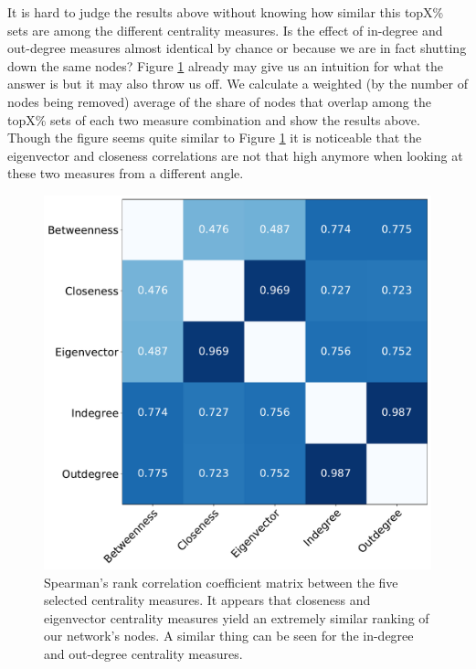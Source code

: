 \documentclass{Resources/netsci-project}
\begin{document}
It is hard to judge the results above without knowing how similar this topX\% sets are among the different centrality measures. Is the effect of in-degree and out-degree measures almost identical by chance or because we are in fact shutting down the same nodes? Figure \ref{fig:spearman_matrix} already may give us an intuition for what the answer is but it may also throw us off. We calculate a weighted (by the number of nodes being removed) average of the share of nodes that overlap among the topX\% sets of each two measure combination and show the results above. Though the figure seems quite similar to Figure \ref{fig:spearman_matrix} it is noticeable that the eigenvector and closeness correlations are not that high anymore when looking at these two measures from a different angle.





\begin{figure}[!ht]
    \centering
    \includegraphics[width=0.5\linewidth]{Figures/spearman_matrix.pdf}
    \caption{Spearman's rank correlation coefficient matrix between the five selected centrality measures. It appears that closeness and eigenvector centrality measures yield an extremely similar ranking of our network's nodes. A similar thing can be seen for the in-degree and out-degree centrality measures.}
    \label{fig:spearman_matrix}  
\end{figure}
\end{document}
